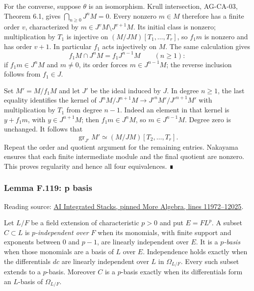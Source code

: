 \documentclass[11pt,a4paper,openany]{report}
\begin{document}
For the converse, suppose \(\theta\) is an isomorphism. Krull intersection, AG-CA-03, Theorem 6.1, gives \(\bigcap_{n\geq0}J^nM=0\). Every nonzero \(m\in M\) therefore has a finite order \(v\), characterized by \(m\in J^vM\setminus J^{v+1}M\). Its initial class is nonzero; multiplication by \(T_1\) is injective on \((M/JM)[T_1,\ldots,T_r]\), so \(f_1m\) is nonzero and has order \(v+1\). In particular \(f_1\) acts injectively on \(M\). The same calculation gives \[f_1M\cap J^nM=f_1J^{n-1}M\qquad(n\geq1):\] if \(f_1m\in J^nM\) and \(m\ne0\), its order forces \(m\in J^{n-1}M\); the reverse inclusion follows from \(f_1\in J\).

Set \(M'=M/f_1M\) and let \(J'\) be the ideal induced by \(J\). In degree \(n\geq1\), the last equality identifies the kernel of \(J^nM/J^{n+1}M\to J'^nM'/J'^{n+1}M'\) with multiplication by \(T_1\) from degree \(n-1\). Indeed an element in that kernel is \(y+f_1m\), with \(y\in J^{n+1}M\); then \(f_1m\in J^nM\), so \(m\in J^{n-1}M\). Degree zero is unchanged. It follows that \[\operatorname{gr}_{J'}M'\simeq(M/JM)[T_2,\ldots,T_r].\] Repeat the order and quotient argument for the remaining entries. Nakayama ensures that each finite intermediate module and the final quotient are nonzero. This proves regularity and hence all four equivalences. ∎

\label{AG-RG-S05-more-algebra-lemma-p-basis}

\subsubsection{Lemma F.119: p basis}\label{AG-RG-S05-lemma-f.119-p-basis}

Reading source: \href{https://github.com/KokunoYumeto/unofficial-stacks-project-ai-drafts/blob/565b10e987aba5969b21145a0833f42d69f96790/more-algebra.tex\#L11972-L12025}{AI Integrated Stacks, pinned More Algebra, lines 11972--12025}.

Let \(L/F\) be a field extension of characteristic \(p>0\) and put \(E=FL^p\). A subset \(C\subset L\) is \emph{\(p\)-independent over \(F\)} when its monomials, with finite support and exponents between \(0\) and \(p-1\), are linearly independent over \(E\). It is a \emph{\(p\)-basis} when those monomials are a basis of \(L\) over \(E\). Independence holds exactly when the differentials \(dc\) are linearly independent over \(L\) in \(\Omega_{L/F}\). Every such subset extends to a \(p\)-basis. Moreover \(C\) is a \(p\)-basis exactly when its differentials form an \(L\)-basis of \(\Omega_{L/F}\).
\end{document}
